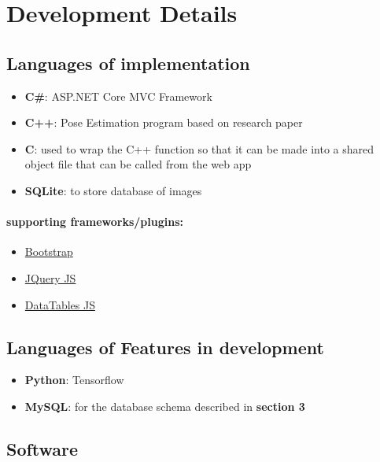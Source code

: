 \documentclass{scrreprt}
\begin{document}
\chapter{Development Details}

\section{Languages of implementation}

\begin{itemize}
    \item \textbf{C\#}: ASP.NET Core MVC Framework
    \item \textbf{C++}: Pose Estimation program based on research paper
    \item \textbf{C}: used to wrap the C++ function so that it can be made into a shared object file that can be called from the web app
    \item \textbf{SQLite}: to store database of images
\end{itemize}

\subsubsection{supporting frameworks/plugins:}

\begin{itemize}
    \item \href{http://getbootstrap.com/}{Bootstrap}
    \item \href{https://jquery.com/}{JQuery JS}
    \item \href{https://datatables.net/}{DataTables JS}
\end{itemize}

\section{Languages of Features in development}

\begin{itemize}
    \item \textbf{Python}: Tensorflow
    \item \textbf{MySQL}: for the database schema described in \textbf{section 3}

\end{itemize}

\section{Software}
\end{document}

